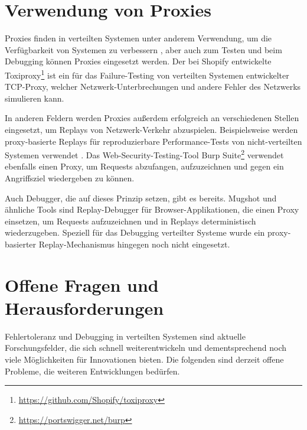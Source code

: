 \documentclass[12pt,a4paper]{report}
\begin{document}
\section{Verwendung von Proxies}
\label{chap:proxies}
Proxies finden in verteilten Systemen unter anderem Verwendung, um die Verfügbarkeit von Systemen zu verbessern
\cite{distributed_systems_concepts_and_design}, aber auch zum Testen und beim Debugging können Proxies eingesetzt werden. Der bei
Shopify entwickelte Toxiproxy\footnote{\label{foot:toxiproxy}\url{https://github.com/Shopify/toxiproxy}} ist ein für das
Failure-Testing von verteilten Systemen entwickelter TCP-Proxy, welcher Netzwerk-Unterbrechungen und andere Fehler des Netzwerks
simulieren kann.

In anderen Feldern werden Proxies außerdem erfolgreich an verschiedenen Stellen eingesetzt, um Replays von Netzwerk-Verkehr
abzuspielen. Beispielsweise werden proxy-basierte Replays für reproduzierbare Performance-Tests von nicht-verteilten Systemen
verwendet \cite{performace_replay_testing}. Das Web-Security-Testing-Tool Burp Suite\footnote{\url{https://portswigger.net/burp}}
verwendet ebenfalls einen Proxy, um Requests abzufangen, aufzuzeichnen und gegen ein Angriffsziel wiedergeben zu können.

Auch Debugger, die auf dieses Prinzip setzen, gibt es bereits. Mugshot \cite{mugshot_js_replay_proxy} und ähnliche Tools
\cite{mahimahi_http_replay} sind Replay-Debugger für Browser-Applikationen, die einen Proxy einsetzen, um Requests aufzuzeichnen
und in Replays deterministisch wiederzugeben. Speziell für das Debugging verteilter Systeme wurde ein proxy-basierter
Replay-Mechanismus hingegen noch nicht eingesetzt.

\section{Offene Fragen und Herausforderungen}
\label{chap:hypothesis}
Fehlertoleranz und Debugging in verteilten Systemen sind aktuelle Forsch\-ungsfelder, die sich schnell weiterentwickeln und
dementsprechend noch viele Möglichkeiten für Innovationen bieten. Die folgenden sind derzeit offene Probleme, die weiteren
Entwicklungen bedürfen.
\end{document}
